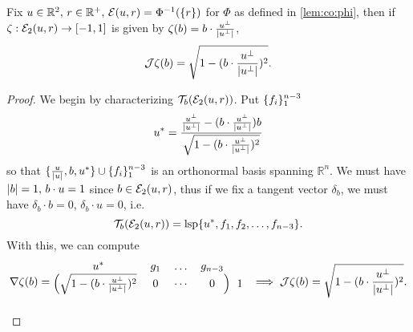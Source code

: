 \documentclass{article}
\newcommand{\lsp}[1]{\mathrm{lsp}\braces{#1}}
\newcommand{\R}[1]{\mathbb{R}^{#1}}
\newcommand{\optparens}[1]{\ifthenelse{\equal{#1}{}}{}{\parens{#1}}}
\newcommand{\E}[1]{\mathcal{E}\optparens{#1}}
\newcommand{\Et}[1]{\mathcal{E}_2\optparens{#1}}
\newcommand{\J}[1]{\mathcal{J}{#1}}
\newcommand{\T}[2]{\mathcal{T}_{#2}\parens{#1}}
\renewcommand{\dot}[2]{{#1}\cdot{#2}}
\newcommand{\pdot}[2]{\parens{\dot{#1}{#2}}}
\begin{document}
\begin{lemma} \label{lem:co:zeta}%
  Fix $u \in \R{2}, \, r \in \R{+}, \, \E{u, r} = \Phi^{-1}(\braces{r})$ for $\Phi$ as defined in \ref{lem:co:phi}, then if $\zeta : \Et{u, r} \to [-1, 1]$ is given by $\zeta(b) = \dot{b}{\frac{u^\perp}{\abs{u^\perp}}}$,
  $$
  \J{\zeta}(b) = \sqrt{1 - \pdot{b}{\frac{u^\perp}{\abs{u^\perp}}}^2}.
  $$
\end{lemma}
\begin{proof}
  We begin by characterizing $\T{\Et{u,r}}{b}$. Put $\{ f_i \}_1^{n-3}$
$$
u^* = \frac{\frac{u^\perp}{\lvert u^\perp\rvert} - (b \cdot \frac{u^\perp}{\lvert u^\perp\rvert}) b}{\sqrt{1-(b \cdot \frac{u^\perp}{\lvert u^\perp\rvert})^2}}
$$
  so that $\{ \frac{u}{\lvert u\rvert}, b, u^* \} \cup \{ f_i \}_1^{n-3}$ is an orthonormal basis spanning $\R{n}$. We must have $\abs{b} = 1, \, \dot{b}{u} = 1$ since $b \in \Et{u,r}$, thus if we fix a tangent vector $\delta_b$, we must have $\dot{\delta_b}{b} = 0, \, \dot{\delta_b}{u} = 0$, i.e.
  $$
  \T{\Et{u,r}}{b} = \lsp{ u^*, f_1, f_2, \ldots, f_{n-3} }.
  $$
  With this, we can compute
  $$
\nabla \zeta(b) =
\begin{blockarray}{ccccc}
  u^* & g_1 & \ldots & g_{n-3} \\
  \begin{block}{(cccc)c}
    \sqrt{1-\parens{b \cdot \frac{u^\perp}{\abs{u^\perp}}}^2}  & 0 & \cdots & 0 & 1 \\
  \end{block}
\end{blockarray} \implies \J{\zeta}(b) = \sqrt{1-\parens{b \cdot \frac{u^\perp}{\abs{u^\perp}}}^2}.
$$
\end{proof}%
\end{document}
